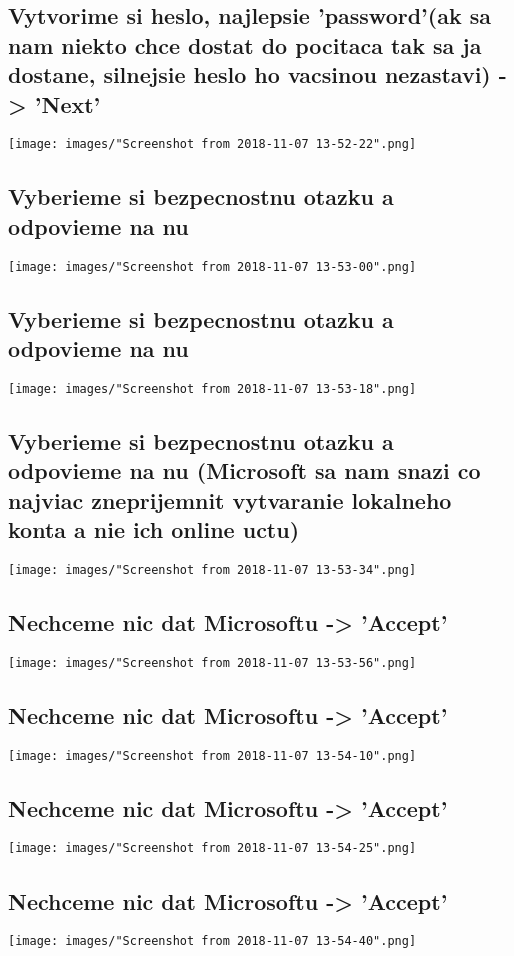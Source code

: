 \documentclass[slovak]{article}
\begin{document}
  \subsection{Vytvorime si heslo, najlepsie 'password'(ak sa nam niekto chce dostat do pocitaca tak sa ja dostane, silnejsie heslo ho vacsinou nezastavi) -> 'Next'}
  \texttt{[image: images/"Screenshot from 2018-11-07 13-52-22".png]}
  \subsection{Vyberieme si bezpecnostnu otazku a odpovieme na nu}
  \texttt{[image: images/"Screenshot from 2018-11-07 13-53-00".png]}
  \subsection{Vyberieme si bezpecnostnu otazku a odpovieme na nu}
  \texttt{[image: images/"Screenshot from 2018-11-07 13-53-18".png]}
  \subsection{Vyberieme si bezpecnostnu otazku a odpovieme na nu (Microsoft sa nam snazi co najviac zneprijemnit vytvaranie lokalneho konta a nie ich online uctu)}
  \texttt{[image: images/"Screenshot from 2018-11-07 13-53-34".png]}
  \subsection{Nechceme nic dat Microsoftu -> 'Accept'}
  \texttt{[image: images/"Screenshot from 2018-11-07 13-53-56".png]}
  \subsection{Nechceme nic dat Microsoftu -> 'Accept'}
  \texttt{[image: images/"Screenshot from 2018-11-07 13-54-10".png]}
  \subsection{Nechceme nic dat Microsoftu -> 'Accept'}
  \texttt{[image: images/"Screenshot from 2018-11-07 13-54-25".png]}
  \subsection{Nechceme nic dat Microsoftu -> 'Accept'}
  \texttt{[image: images/"Screenshot from 2018-11-07 13-54-40".png]}
\end{document}
